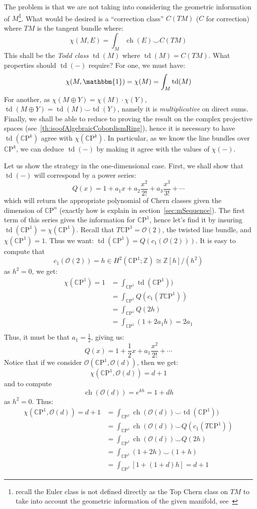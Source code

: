 \documentclass{book}
\newcommand{\Z}{{\mathbb{Z}}}
\newcommand{\CO}{{\mathcal{O}}}
\newcommand{\CP}{{\mathbb{C}\mathrm{P}}}
\newcommand{\ch}{{\operatorname{ch}}}
\newcommand{\td}{{\operatorname{td}}}
\renewcommand{\ch}{{\operatorname{ch}}}
\begin{document}
The problem is that we are not taking into considering the geometric information of $M$\footnote{recall the
Euler class is not defined directly as the Top Chern class on  $TM$ to take into account the geometric
information of the given manifold, see~\cite{NateKTheory}}. What would be desired
is a ``correction class'' $C(TM)$ ($C$ for correction) where $TM$ is the tangent bundle where:
\[
  \chi(M, E) = \int_M \ch(E) \smile C(TM)
\]
This shall be the \emph{Todd class} $\td(M)$ where $\td(M) = C(TM)$. What properties should $\td(-)$ require? For one, we must have:
\[
  \chi(M, \mathbbm{1}) = \chi(M) = \int_M \td(M)
\]
For another, as $\chi(M\oplus Y) = \chi(M)\cdot \chi(Y)$, $\td(M\oplus Y) = \td(M)\smile \td(Y)$, namely it is
\emph{multiplicative} on direct sums. Finally, we shall be able to reduce to proving the result on the complex
projective spaces (see~\cref{th:isoofAlgebraicCobordismRing}), hence
it is necessary to have $\td(\CP^k)$ agree with $\chi(\CP^k)$. In particular, as we know the line bundles over
$\CP^k$, we can deduce $\td(-)$ by making it agree with the values of $\chi(-)$.

Let us show the strategy in the one-dimensional case. First, we shall show that
$\td(-)$ will correspond by a power series:
\[
  Q(x) = 1 + a_1x + a_2\frac{x^2}{2!} + a_3 \frac{x^3}{3!} +  \cdots
\]
which will return the appropriate polynomial of Chern classes given the dimension of $\CP^n$ (exactly how is explain
in section~\ref{sec:mSequence}). The first term of this series gives the information for $\CP^1$, hence let's
find it by insuring $\td(\CP^1) = \chi(\CP^1)$. Recall that $T\CP^1 = \CO(2)$, the twisted line bundle, and
$\chi(\CP^1) = 1$. Thus we want: $\td(\CP^1) = Q\left(c_1(\CO(2))\right)$. It is easy to compute that
\[
  c_1(\CO(2)) = h \in H^2(\CP^1; \Z) \cong \Z[h]/(h^2)
\]
as $h^2 = 0$, we get:
\begin{align*}
  \chi(\CP^1) = 1 &= \int_{\CP^1} \td(\CP^1))\\
  &= \int_{\CP^1} Q(c_1(T\CP^1))\\
  &= \int_{\CP^1} Q(2h)\\
  &= \int_{\CP^1} (1 + 2a_1h) = 2a_1\\
\end{align*}
Thus, it must be that $a_1 = \frac{1}{2}$, giving us:
\[
  Q(x) = 1 + \frac{1}{2}x + a_1 \frac{x^2}{2!} + \cdots
\]
Notice that if we consider $\CO(\CP^1, \CO(d))$, then we get:
\[
  \chi(\CP^1, \CO(d)) = d+1
\]
and to compute
\[
  \ch(\CO(d)) = e^{kh} = 1 + dh
\]
as $h^2 = 0$. Thus:
\begin{align*}
  \chi(\CP^1, \CO(d)) = d+1 &= \int_{\CP^1} \ch(\CO(d)) \smile \td(\CP^1))\\
  &= \int_{\CP^1} \ch(\CO(d)) \smile Q(c_1(T\CP^1))\\
  &= \int_{\CP^1} \ch(\CO(d)) \smile Q(2h)\\
  &= \int_{\CP^1} (1+2h) \smile (1 + h)\\
  &= \int_{\CP^1} [1 + (1 + d)h] = d+1
\end{align*}
\end{document}
